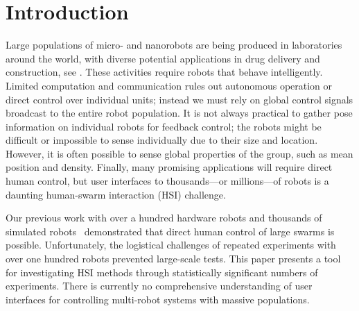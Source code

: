 \section{Introduction}\label{sec:Intro}


Large populations of micro- and nanorobots are being produced in laboratories around the world, with diverse potential applications in drug delivery and construction, see \cite{Peyer2013,Shirai2005,Chiang2011}. These activities require robots that behave intelligently.
Limited computation and communication rules out autonomous operation or direct control over individual units; instead we must rely on global control signals broadcast to the entire robot population.  It is not always practical to gather pose information on individual robots for feedback control; the robots might be difficult or impossible to sense individually due to their size and location. However, it is often possible to sense global properties of the group, such as mean position and density.  Finally, many promising applications will require direct human control, but user interfaces to thousands---or millions---of robots is a daunting human-swarm interaction (HSI) challenge. 

Our previous work with over a hundred hardware robots and thousands of simulated robots~\cite{Becker2013b} demonstrated that direct human control of large swarms is possible. Unfortunately, the logistical challenges of repeated experiments with over one hundred robots prevented large-scale tests. This paper presents a tool for investigating HSI methods through statistically significant numbers of experiments.  There is currently no comprehensive understanding of user interfaces for controlling multi-robot systems with massive populations.  

